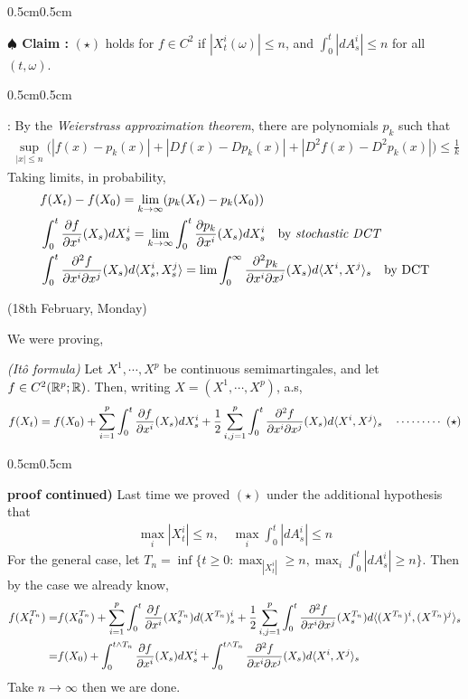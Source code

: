\documentclass[12pt,a4paper]{article}
\newenvironment{proof}
{\begin{changemargin}{0.5cm}{0.5cm} 
	}%
	{\end{changemargin}
}
\newenvironment{subproof}
{\begin{changemargin}{0.5cm}{0.5cm} 
	}%
	{\end{changemargin}
}
\newenvironment{p}
{\begin{proof} 
	}%
	{\end{proof}
}
\begin{document}
\begin{p}
\textbf{$\spadesuit$ Claim :} $(\star)$ holds for $f\in C^2$ if $|X_t^i (\omega)|\leq n$, and $\int_0^t |dA_s^i| \leq n$ for all $(t, \omega)$.
\begin{subproof}
: By the \emph{Weierstrass approximation theorem}, there are polynomials $p_k$ such that
\begin{align*}
\sup_{|x| \leq n} \Big(|f(x) - p_k(x)| + |D f(x) - D p_k(x)|+ |D^2 f(x) - D^2 p_k(x)| \Big) \leq \frac{1}{k}
\end{align*}
Taking limits, in probability,
\begin{align*}
& f(X_t) - f(X_0) = \lim_{k\rightarrow \infty} (p_k(X_t) - p_k(X_0))\\
& \int_0^t \frac{\partial f}{\partial x^i} (X_s) dX_s^i = \lim_{k\rightarrow \infty} \int_0^t \frac{\partial p_k}{\partial x^i}(X_s) dX_s^i \quad \text{by } \emph{stochastic DCT}\\
& \int_0^t \frac{\partial^2 f}{\partial x^i \partial x^j}(X_s)d\langle X_s^i, X_s^j \rangle = \lim \int_0^\infty \frac{\partial^2 p_k}{\partial x^i \partial x^j}(X_s) d\langle X^i, X^j \rangle_s \quad \text{by DCT}
\end{align*}
\end{subproof}

\end{p}
\s

\newday

(18th February, Monday)
\s

We were proving,

\thm \emph{(It\^o formula)} Let $X^1, \cdots, X^p$ be continuous semimartingales, and let $f \in C^2(\mathbb{R}^p ; \mathbb{R})$. Then, writing $X = (X^1, \cdots, X^p)$, a.s,
\begin{align*}
f(X_t) =  f(X_0) + \sum_{i=1}^p \int_0^t \frac{\partial f}{\partial x^i}(X_s)dX_s^i + \frac{1}{2} \sum_{i,j=1}^p \int_0^t \frac{\partial^2 f}{\partial x^i \partial x^j} (X_s) d\langle X^i, X^j \rangle_s \quad \cdots\cdots\cdots\,\,(\star)
\end{align*}
\begin{p}
\textbf{proof continued)} Last time we proved $(\star)$ under the additional hypothesis that
\begin{align*}
\max_i |X_t^i| \leq n, \quad \max_{i} \int_0^t |dA_s^i| \leq n
\end{align*}
For the general case, let $T_n = \inf \{t\geq 0 : \max_ |X_t^i| \geq n, \max_i \int_0^t |dA_s^i| \geq n\}$. Then by the case we already know,
\begin{align*}
f(X_t^{T_n}) =& f(X_0^{T_n}) + \sum_{i=1}^{p} \int_0^t \frac{\partial f}{\partial x^i} (X_s^{T_n}) d(X^{T_n})_s^i + \frac{1}{2} \sum_{i,j=1}^p \int_0^t \frac{\partial^2 f}{\partial x^i \partial x^j} (X_s^{T_n}) d\langle (X^{T_n})^i, (X^{T_n})^j \rangle_s \\
=& f(X_0) + \int_0^{t\wedge T_n} \frac{\partial f}{\partial x^i} (X_s) dX_s^i + \int_0^{t\wedge T_n} \frac{\partial^2 f}{\partial x^i \partial x^j} (X_s) d\langle X^i, X^j \rangle_s
\end{align*}
Take $n\rightarrow\infty$ then we are done.

\eop
\end{p}
\s
\end{document}
